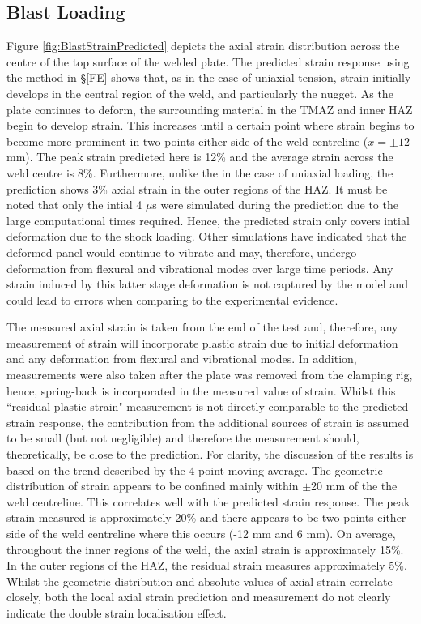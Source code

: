 \subsection{Blast Loading}
\label{RADBlastLoading}
Figure \ref{fig:BlastStrainPredicted} depicts the axial strain distribution across the centre of the top surface of the welded plate. The predicted strain response using the method in \S\ref{FE} shows that, as in the case of uniaxial tension, strain initially develops in the central region of the weld, and particularly the nugget. As the plate continues to deform, the surrounding material in the TMAZ and inner HAZ begin to develop strain. This increases until a certain point where strain begins to become more prominent in two points either side of the weld centreline ($x=\pm12$ mm). The peak strain predicted here is 12\% and the average strain across the weld centre is 8\%. Furthermore, unlike the in the case of uniaxial loading, the prediction shows 3\% axial strain in the outer regions of the HAZ. It must be noted that only the intial 4 $\mu$s were simulated during the prediction due to the large computational times required. Hence, the predicted strain only covers intial deformation due to the shock loading. Other simulations have indicated that the deformed panel would continue to vibrate and may, therefore, undergo deformation from flexural and vibrational modes over large time periods. Any strain induced by this latter stage deformation is not captured by the model and could lead to errors when comparing to the experimental evidence. 

The measured axial strain is taken from the end of the test and, therefore, any measurement of strain will incorporate plastic strain due to initial deformation and any deformation from flexural and vibrational modes. In addition, measurements were also taken after the plate was removed from the clamping rig, hence, spring-back is incorporated in the measured value of strain. Whilst this ``residual plastic strain" measurement is not directly comparable to the predicted strain response, the contribution from the additional sources of strain is assumed to be small (but not negligible) and therefore the measurement should, theoretically, be close to the prediction. For clarity, the discussion of the results is based on the trend described by the 4-point moving average. The geometric distribution of strain appears to be confined mainly within $\pm$20 mm  of the the weld centreline. This correlates well with the predicted strain response. The peak strain measured is approximately 20\% and there appears to be two points either side of the weld centreline where this occurs (-12 mm and 6 mm). On average, throughout the inner regions of the weld, the axial strain is approximately 15\%. In the outer regions of the HAZ, the residual strain measures approximately 5\%. Whilst the geometric distribution and absolute values of axial strain correlate closely, both the local axial strain prediction and measurement do not clearly indicate the double strain localisation effect. 

